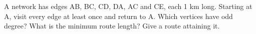 \documentclass[11pt]{article}
\begin{document}
A network has edges AB, BC, CD, DA, AC and CE, each 1 km long. Starting at A, visit every edge at least once and return to A. Which vertices have odd degree? What is the minimum route length? Give a route attaining it.\par
\vspace{5pt}
\end{document}
